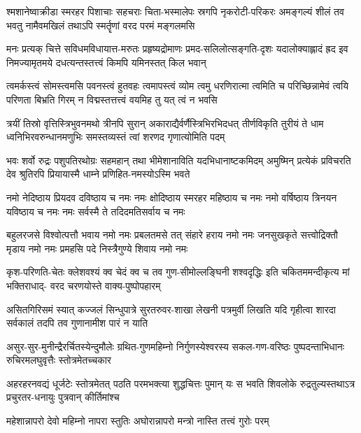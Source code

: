 \fourlineindentedshloka
{श्मशानेष्वाक्रीडा स्मरहर पिशाचाः सहचराः}
{चिता-भस्मालेपः स्रगपि नृकरोटी-परिकरः}
{अमङ्गल्यं शीलं तव भवतु नामैवमखिलं}
{तथाऽपि स्मर्तॄणां वरद परमं मङ्गलमसि}

\fourlineindentedshloka
{मनः प्रत्यक् चित्ते सविधमविधायात्त-मरुतः}
{प्रहृष्यद्रोमाणः प्रमद-सलिलोत्सङ्गति-दृशः}
{यदालोक्याह्लादं ह्रद इव निमज्यामृतमये}
{दधत्यन्तस्तत्त्वं किमपि यमिनस्तत् किल भवान्}

\fourlineindentedshloka
{त्वमर्कस्त्वं सोमस्त्वमसि पवनस्त्वं हुतवहः}
{त्वमापस्त्वं व्योम त्वमु धरणिरात्मा त्वमिति च}
{परिच्छिन्नामेवं त्वयि परिणता बिभ्रति गिरम्}
{न विद्मस्तत्तत्त्वं वयमिह तु यत् त्वं न भवसि}

\fourlineindentedshloka
{त्रयीं तिस्रो वृत्तिस्त्रिभुवनमथो त्रीनपि सुरान्}
{अकाराद्यैर्वर्णैस्त्रिभिरभिदधत् तीर्णविकृति}
{तुरीयं ते धाम ध्वनिभिरवरुन्धानमणुभिः}
{समस्तव्यस्तं त्वां शरणद गृणात्योमिति पदम्}

\fourlineindentedshloka
{भवः शर्वो रुद्रः पशुपतिरथोग्रः सहमहान्}
{तथा भीमेशानाविति यदभिधानाष्टकमिदम्}
{अमुष्मिन् प्रत्येकं प्रविचरति देव श्रुतिरपि}
{प्रियायास्मै धाम्ने प्रणिहित-नमस्योऽस्मि भवते}

\fourlineindentedshloka
{नमो नेदिष्ठाय प्रियदव दविष्ठाय च नमः}
{नमः क्षोदिष्ठाय स्मरहर महिष्ठाय च नमः}
{नमो वर्षिष्ठाय त्रिनयन यविष्ठाय च नमः}
{नमः सर्वस्मै ते तदिदमतिसर्वाय च नमः}

\fourlineindentedshloka
{बहुलरजसे विश्वोत्पत्तौ भवाय नमो नमः}
{प्रबलतमसे तत् संहारे हराय नमो नमः}
{जनसुखकृते सत्त्वोद्रिक्तौ मृडाय नमो नमः}
{प्रमहसि पदे निस्त्रैगुण्ये शिवाय नमो नमः}

\fourlineindentedshloka
{कृश-परिणति-चेतः क्लेशवश्यं क्व चेदं}
{क्व च तव गुण-सीमोल्लङ्घिनी शश्वदृद्धिः}
{इति चकितममन्दीकृत्य मां भक्तिराधाद्-}
{वरद चरणयोस्ते वाक्य-पुष्पोपहारम्}

\fourlineindentedshloka
{असितगिरिसमं स्यात् कज्जलं सिन्धुपात्रे}
{सुरतरुवर-शाखा लेखनी पत्रमुर्वी}
{लिखति यदि गृहीत्वा शारदा सर्वकालं}
{तदपि तव गुणानामीश पारं न याति}

\fourlineindentedshloka
{असुर-सुर-मुनीन्द्रैरर्चितस्येन्दुमौलेः}
{ग्रथित-गुणमहिम्नो निर्गुणस्येश्वरस्य}
{सकल-गण-वरिष्ठः पुष्पदन्ताभिधानः}
{रुचिरमलघुवृत्तैः स्तोत्रमेतच्चकार}

\fourlineindentedshloka
{अहरहरनवद्यं धूर्जटेः स्तोत्रमेतत्}
{पठति परमभक्त्या शुद्धचित्तः पुमान् यः}
{स भवति शिवलोके रुद्रतुल्यस्तथाऽत्र}
{प्रचुरतर-धनायुः पुत्रवान् कीर्तिमांश्च}

\twolineshloka
{महेशान्नापरो देवो महिम्नो नापरा स्तुतिः}
{अघोरान्नापरो मन्त्रो नास्ति तत्त्वं गुरोः परम्}

